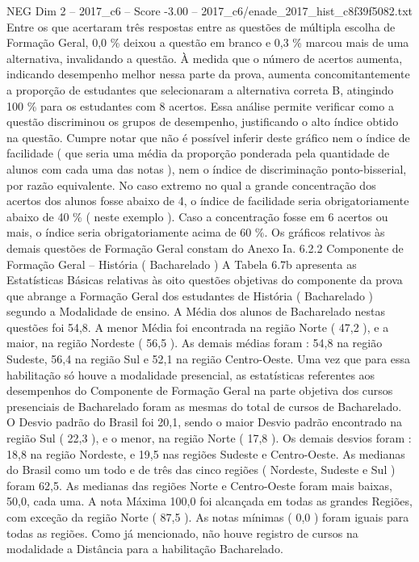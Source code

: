 \begin{textsample}{NEG Dim 2 – 2017\_c6 – Score -3.00 – 2017\_c6/enade\_2017\_hist\_c8f39f5082.txt}
Entre os que acertaram três respostas entre as questões de múltipla escolha de Formação Geral, 0,0 \% deixou a questão em branco e 0,3 \% marcou mais de uma alternativa, invalidando a questão.
À medida que o número de acertos aumenta, indicando desempenho melhor nessa parte da prova, aumenta concomitantemente a proporção de estudantes que selecionaram a alternativa correta B, atingindo 100 \% para os estudantes com 8 acertos.
Essa análise permite verificar como a questão discriminou os grupos de desempenho, justificando o alto índice obtido na questão.
Cumpre notar que não é possível inferir deste gráfico nem o índice de facilidade ( que seria uma média da proporção ponderada pela quantidade de alunos com cada uma das notas ), nem o índice de discriminação ponto-bisserial, por razão equivalente.
No caso extremo no qual a grande concentração dos acertos dos alunos fosse abaixo de 4, o índice de facilidade seria obrigatoriamente abaixo de 40 \% ( neste exemplo ).
Caso a concentração fosse em 6 acertos ou mais, o índice seria obrigatoriamente acima de 60 \%.
Os gráficos relativos às demais questões de Formação Geral constam do Anexo Ia. 6.2.2 Componente de Formação Geral – História ( Bacharelado ) A Tabela 6.7b apresenta as Estatísticas Básicas relativas às oito questões objetivas do componente da prova que abrange a Formação Geral dos estudantes de História ( Bacharelado ) segundo a Modalidade de ensino.
A Média dos alunos de Bacharelado nestas questões foi 54,8.
A menor Média foi encontrada na região Norte ( 47,2 ), e a maior, na região Nordeste ( 56,5 ).
As demais médias foram : 54,8 na região Sudeste, 56,4 na região Sul e 52,1 na região Centro-Oeste.
Uma vez que para essa habilitação só houve a modalidade presencial, as estatísticas referentes aos desempenhos do Componente de Formação Geral na parte objetiva dos cursos presenciais de Bacharelado foram as mesmas do total de cursos de Bacharelado.
O Desvio padrão do Brasil foi 20,1, sendo o maior Desvio padrão encontrado na região Sul ( 22,3 ), e o menor, na região Norte ( 17,8 ).
Os demais desvios foram : 18,8 na região Nordeste, e 19,5 nas regiões Sudeste e Centro-Oeste.
As medianas do Brasil como um todo e de três das cinco regiões ( Nordeste, Sudeste e Sul ) foram 62,5.
As medianas das regiões Norte e Centro-Oeste foram mais baixas, 50,0, cada uma.
A nota Máxima 100,0 foi alcançada em todas as grandes Regiões, com exceção da região Norte ( 87,5 ).
As notas mínimas ( 0,0 ) foram iguais para todas as regiões.
Como já mencionado, não houve registro de cursos na modalidade a Distância para a habilitação Bacharelado.

\end{textsample}
